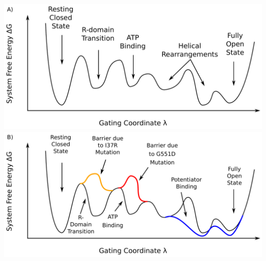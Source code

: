	\begin{center}
		\begingroup
	\includegraphics[width=\textwidth]{figures/perspective/drug_landscape_1.pdf}\\
	\includegraphics[width=\textwidth]{figures/perspective/drug_landscape_3.pdf}\\
		\endgroup
	\end{center}
	\begingroup
	\captionsetup{singlelinecheck = false, justification=raggedright}

